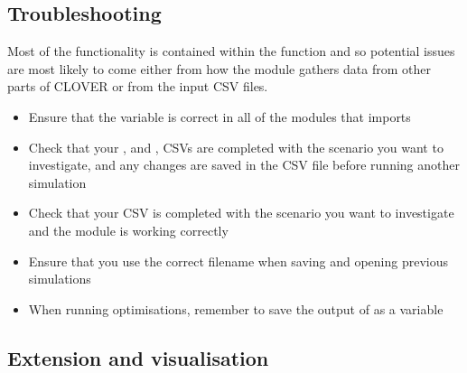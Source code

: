 \documentclass[letterpaper,10pt,english]{sphinxmanual}
\begin{document}
\sphinxAtStartPar
{}


\subsection{Troubleshooting}
\label{\detokenize{optimisation:troubleshooting}}
\sphinxAtStartPar
Most of the  functionality is contained within the
 function and so
potential issues are most likely to come either from how the module
gathers data from other parts of CLOVER or from the input CSV files.
\begin{itemize}
\item {} 
\sphinxAtStartPar
Ensure that the  variable is correct in all of the
modules that  imports

\item {} 
\sphinxAtStartPar
Check that your ,  and
, CSVs are completed with the scenario you
want to investigate, and any changes are saved in the CSV file before
running another simulation

\item {} 
\sphinxAtStartPar
Check that your  CSV is completed with the
scenario you want to investigate and the  module is
working correctly

\item {} 
\sphinxAtStartPar
Ensure that you use the correct filename when saving and opening
previous simulations

\item {} 
\sphinxAtStartPar
When running optimisations, remember to save the output of
 as a variable

\end{itemize}


\subsection{Extension and visualisation}
\label{\detokenize{optimisation:extension-and-visualisation}}
\end{document}
